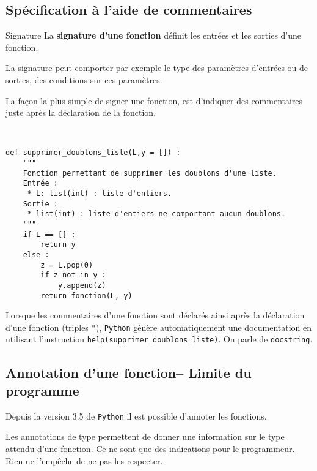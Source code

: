 \subsection{Spécification à l'aide de commentaires}
\begin{defi}{Signature}
La \textbf{signature d'une fonction} définit les entrées et les sorties d'une fonction. 
\end{defi}

La signature peut comporter par exemple le type  des paramètres d'entrées ou de sorties, des conditions sur ces paramètres. 

La façon la plus simple de signer une fonction, est d'indiquer des commentaires juste après la déclaration de la fonction. 

\begin{exemple}~\\
\begin{lstlisting}
def supprimer_doublons_liste(L,y = []) :
    """
    Fonction permettant de supprimer les doublons d'une liste.
    Entrée : 
     * L: list(int) : liste d'entiers. 
    Sortie : 
     * list(int) : liste d'entiers ne comportant aucun doublons.
    """
    if L == [] : 
        return y
    else : 
        z = L.pop(0)
        if z not in y : 
            y.append(z)
        return fonction(L, y)
\end{lstlisting}

Lorsque les commentaires d'une fonction sont déclarés ainsi après la déclaration d'une fonction (triples \texttt{"}), \texttt{Python} génère automatiquement une documentation en utilisant l'instruction \texttt{help(supprimer\_doublons\_liste)}. On parle de \texttt{docstring}.
\end{exemple}


\subsection{Annotation d'une fonction-- Limite du programme}

Depuis la version 3.5 de \texttt{Python} il est possible d'annoter les fonctions. 
\begin{defi}{} Les annotations de type permettent de donner une information sur le type attendu d'une fonction. Ce ne sont que des indications pour le programmeur. Rien ne l'empêche de ne pas les respecter. 
\end{defi}

